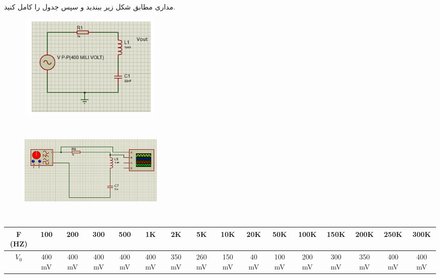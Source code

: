 \documentclass[12pt]{article}
\begin{document}
\clearpage
\subsection{}
مداری مطابق شکل زیر ببندید و سپس جدول را کامل کنید.

\begin{figure}[H]
\begin{center}
\includegraphics[width=7cm, height=5cm]{./images/6.7}
\end{center}
\end{figure}

\begin{figure}[H]
\begin{center}
\includegraphics[width=7cm, height=5cm]{./images/6.7.a}
\end{center}
\end{figure}

\begin{latin}
\begin{table}[H]
\begin{adjustbox}{width=\textwidth}
\begin{tabular}{|c|c|c|c|c|c|c|c|c|c|c|c|c|c|c|c|}
\hline
F (HZ) & 
100 & 
200 & 
300 & 
500 & 
1K & 
2K & 
5K & 
10K & 
20K & 
50K & 
100K & 
150K & 
200K & 
250K & 
300K \\
\hline
\hline
$V_0$ & 400 mV & 400 mV & 400 mV & 400 mV & 400 mV & 350 mV & 
260 mV & 150 mV & 40 mV & 100 mV & 200 mV & 
300 mV & 350 mV & 400 mV & 400 mV \\
\hline
\end{tabular}
\end{adjustbox}
\end{table}
\end{latin}
\end{document}
